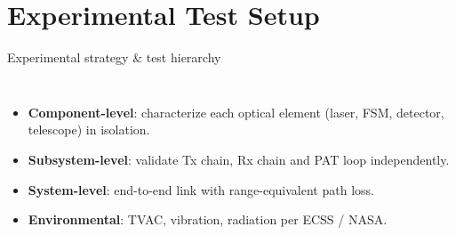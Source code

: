 \documentclass{KAIST-slide}
\newcommand{\ai}{\item[\textcolor{islcteal}{\ding{228}}]}      %
\newcommand{\key}[1]{\textcolor{islcblue}{\textbf{#1}}}        %
\begin{document}
\section{Experimental Test Setup}

\begin{frame}{Experimental strategy \& test hierarchy}
    \begin{columns}[T]
        \begin{itemize}\footnotesize
            \ai \key{Component-level}: characterize each optical element (laser, FSM, detector, telescope) in isolation.
            \ai \key{Subsystem-level}: validate Tx chain, Rx chain and PAT loop independently.
            \ai \key{System-level}: end-to-end link with range-equivalent path loss.
            \ai \key{Environmental}: TVAC, vibration, radiation per ECSS / NASA.
        \end{itemize}
        \scriptsize
    \end{columns}
\end{frame}
\end{document}
